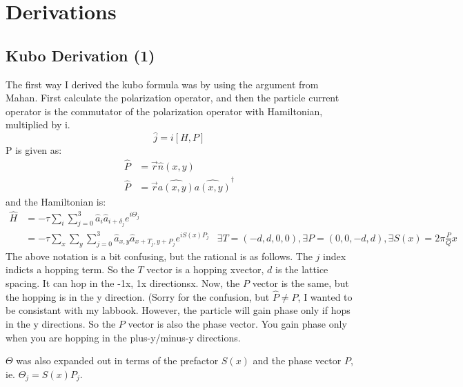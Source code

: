 \documentclass[12pt]{article}
\begin{document}
\section{Derivations}
\subsection{Kubo Derivation (1)}
The first way I derived the kubo formula was by using the argument from
Mahan. First calculate the polarization operator, and then the particle
current operator is the commutator of the polarization operator with
Hamiltonian, multiplied by i.
\[
\label{j_def}
\hat{j} = i[H,P]
\]
P is given as:
\begin{align}
\hat{P} &= \vec{r} \hat{n}(x,y) \\
\hat{P} &= \vec{r} \hat{a(x,y)} \hat{a(x,y)}^\dagger
\end{align}
and the Hamiltonian is:
\begin{align}
\hat{H} &=  -\tau \sum_{i} \sum_{j=0}^3 \hat{a}_i \hat{a}_{i+\delta_j} e^{i \Theta_j}\\
		&= -\tau \sum_{x} \sum_{y} \sum_{j=0}^3\hat{a}_{x,y} \hat{a}_{x+T_j, y+P_j} e^{i S(x) P_j}
		&\exists T = (-d,d,0,0), \exists P = (0,0,-d,d), \exists S(x) = 2 \pi\frac{P}{Q}x
\end{align}
The above notation is a bit confusing, but the rational is as follows.
The $j$ index indicts a hopping term. So the $T$ vector is a hopping xvector, $d$ is
the lattice spacing. It can hop in the -1x, 1x directionsx. Now, the $P$ vector is the same, but the hopping is
in the y direction. (Sorry for the confusion, but $\hat{P} \neq P$, I wanted to be consistant with my labbook. However, the particle will gain phase only if hops in the y directions. So the $P$ vector is also the phase vector. You gain phase only when you are hopping in the plus-y/minus-y directions. 

$\Theta$ was also expanded out in terms of the prefactor $S(x)$ and the phase vector $P$, ie. $\Theta_j = S(x)P_j$.
\end{document}
